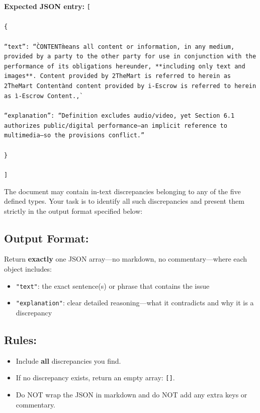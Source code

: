 \documentclass[11pt]{article}
\begin{document}
\begin{tcolorbox}[breakable,colback=lightestgray,colframe=black,title=\textbf{Eval\_3 L2: In-Text Discrepancy Detection Prompt}]
\textbf{Expected JSON entry:}
{\small
\texttt{[\\\\
\{\\\\
``text'': ``\`CONTENT\` means all content or information, in any medium, provided by a party to the other party for use in conjunction with the performance of its obligations hereunder, **including only text and images**. Content provided by 2TheMart is referred to herein as \`2TheMart Content\` and content provided by i-Escrow is referred to herein as \`i-Escrow Content.\`,\\\\
``explanation'': ``Definition excludes audio/video, yet Section 6.1 authorizes public/digital performance—an implicit reference to multimedia—so the provisions conflict.''\\\\
\}\\\\
]}
}

The document may contain in-text discrepancies belonging to any of the five defined types. Your task is to identify all such discrepancies and present them strictly in the output format specified below:

\subsection*{\textbf{Output Format:}}
Return \textbf{exactly} one JSON array—no markdown, no commentary—where each object includes:
\begin{itemize}
    \item \texttt{"text"}: the exact sentence(s) or phrase that contains the issue
    \item \texttt{"explanation"}: clear detailed reasoning—what it contradicts and why it is a discrepancy
\end{itemize}

\subsection*{\textbf{Rules:}}
\begin{itemize}
    \item Include \textbf{all} discrepancies you find.
    \item If no discrepancy exists, return an empty array: \texttt{[]}.
    \item Do NOT wrap the JSON in markdown and do NOT add any extra keys or commentary.
\end{itemize}
\end{tcolorbox}
\end{document}
